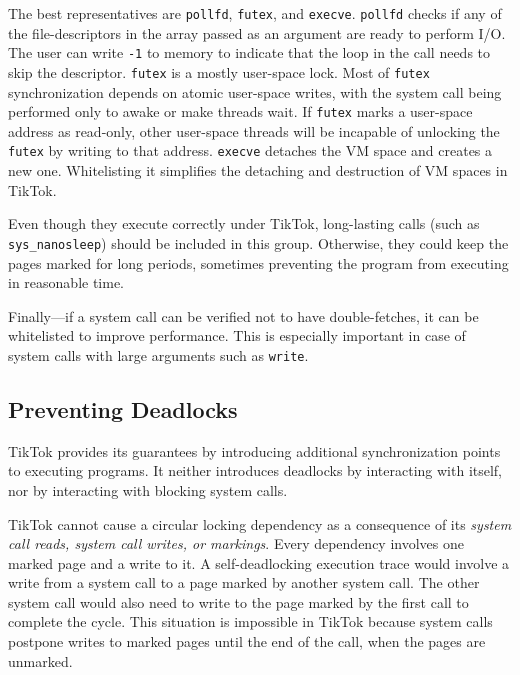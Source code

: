 \documentclass[conference]{IEEEtran}
\newcommand{\sysname}{TikTok}
\begin{document}
The best representatives are \texttt{pollfd}, \texttt{futex}, and
\texttt{execve}. \texttt{pollfd} checks if any of the file-descriptors in the
array passed as an argument are ready to perform I/O. The user can write
\texttt{-1} to memory to indicate that the loop in the call needs to skip the
descriptor. \texttt{futex} is a mostly user-space lock. Most of \texttt{futex}
synchronization depends on atomic user-space writes, with the system call being
performed only to awake or make threads wait. If \texttt{futex} marks a
user-space address as read-only, other user-space threads will be incapable of
unlocking the \texttt{futex} by writing to that address. \texttt{execve}
detaches the VM space and creates a new one. Whitelisting it
simplifies the detaching and destruction of VM spaces in \sysname{}.

Even though they execute correctly under \sysname{}, long-lasting calls (such as
\texttt{sys\_nanosleep}) should be included in this group. Otherwise, they could
keep the pages marked for long periods, sometimes preventing the program from
executing in reasonable time.

Finally---if a system call can be verified not to have double-fetches, it can
be whitelisted to improve performance. This is especially important in case of
system calls with large arguments such as \texttt{write}.

\subsection{Preventing Deadlocks}
\label{subsec:deadlocks}

\sysname{} provides its guarantees by introducing additional synchronization
points to executing programs. It neither introduces deadlocks
by interacting with itself, nor
by interacting with blocking system calls.

\sysname{} cannot cause a circular locking dependency as a consequence of its
\emph{system call reads, system call writes, or markings}. Every dependency
involves one marked page and a write to it. A self-deadlocking execution trace
would involve a write from a system call to a page marked by another
system call. The other system call would also need to write to the page marked
by the first call to complete the cycle. This situation is impossible in
\sysname{} because system calls postpone writes to marked pages until the end of
the call, when the pages are unmarked.
\end{document}
